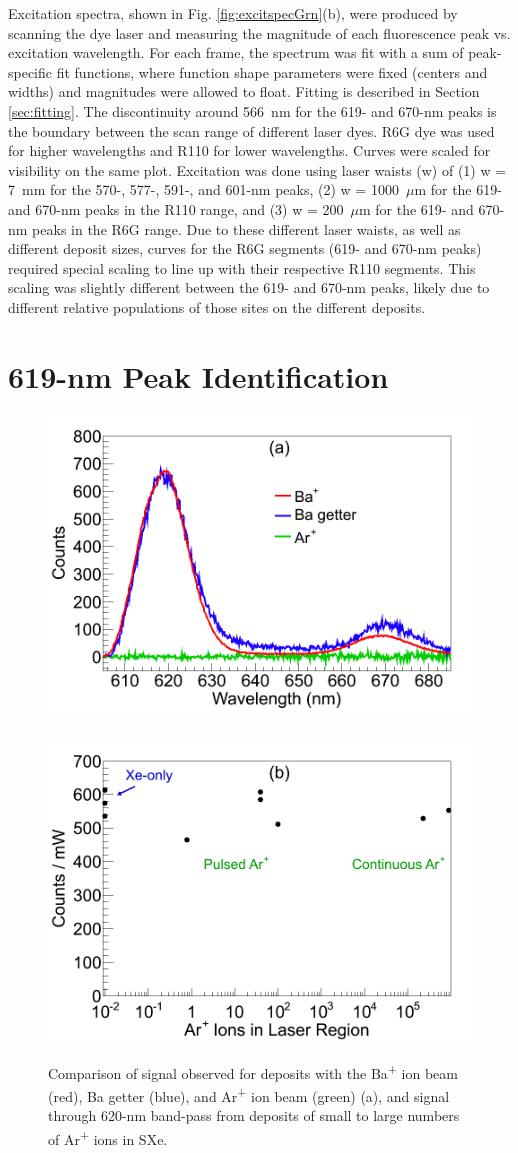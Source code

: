 Excitation spectra, shown in Fig. \ref{fig:excitspecGrn}(b), were produced by scanning the dye laser and measuring the magnitude of each fluorescence peak vs. excitation wavelength.  For each frame, the spectrum was fit with a sum of peak-specific fit functions, where function shape parameters were fixed (centers and widths) and magnitudes were allowed to float.  Fitting is described in Section \ref{sec:fitting}.  The discontinuity around 566~nm for the 619- and 670-nm peaks is the boundary between the scan range of different laser dyes.  R6G dye was used for higher wavelengths and R110 for lower wavelengths.  Curves were scaled for visibility on the same plot.  Excitation was done using laser waists (w) of (1) w = 7~mm for the 570-, 577-, 591-, and 601-nm peaks, (2) w = 1000~$\mu$m for the 619- and 670-nm peaks in the R110 range, and (3) w = 200~$\mu$m for the 619- and 670-nm peaks in the R6G range.  Due to these different laser waists, as well as different deposit sizes, curves for the R6G segments (619- and 670-nm peaks) required special scaling to line up with their respective R110 segments.  This scaling was slightly different between the 619- and 670-nm peaks, likely due to different relative populations of those sites on the different deposits.


\section{619-nm Peak Identification}
\label{sec:619identification}

\begin{figure} %
        \centering
                \includegraphics[width=.5\textwidth]{figures/Ar_vs_Ba.png}
                ~
                \includegraphics[width=.5\textwidth]{figures/ArImaging.png}
                \caption{Comparison of signal observed for deposits with the Ba\textsuperscript{+} ion beam (red), Ba getter (blue), and Ar\textsuperscript{+} ion beam (green) (a), and signal through 620-nm band-pass from deposits of small to large numbers of Ar\textsuperscript{+} ions in SXe.}
\label{fig:ArVsBa}
\end{figure}

